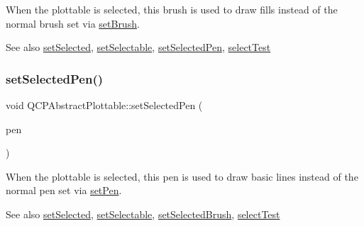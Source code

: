 When the plottable is selected, this brush is used to draw fills instead of the normal brush set via \hyperlink{class_q_c_p_abstract_plottable_a7a4b92144dca6453a1f0f210e27edc74}{set\+Brush}.

\begin{DoxySeeAlso}{See also}
\hyperlink{class_q_c_p_abstract_plottable_afbd5428c2952f59d952e11ab5cd79176}{set\+Selected}, \hyperlink{class_q_c_p_abstract_plottable_a22c69299eb5569e0f6bf084877a37dc4}{set\+Selectable}, \hyperlink{class_q_c_p_abstract_plottable_a6911603cad23ab0469b108224517516f}{set\+Selected\+Pen}, \hyperlink{class_q_c_p_abstract_plottable_a38efe9641d972992a3d44204bc80ec1d}{select\+Test} 
\end{DoxySeeAlso}
\hypertarget{class_q_c_p_abstract_plottable_a6911603cad23ab0469b108224517516f}{}\label{class_q_c_p_abstract_plottable_a6911603cad23ab0469b108224517516f} 
\subsubsection{\texorpdfstring{set\+Selected\+Pen()}{setSelectedPen()}}
{\footnotesize\ttfamily void Q\+C\+P\+Abstract\+Plottable\+::set\+Selected\+Pen (\begin{DoxyParamCaption}\item[{const Q\+Pen \&}]{pen }\end{DoxyParamCaption})}

When the plottable is selected, this pen is used to draw basic lines instead of the normal pen set via \hyperlink{class_q_c_p_abstract_plottable_ab74b09ae4c0e7e13142fe4b5bf46cac7}{set\+Pen}.

\begin{DoxySeeAlso}{See also}
\hyperlink{class_q_c_p_abstract_plottable_afbd5428c2952f59d952e11ab5cd79176}{set\+Selected}, \hyperlink{class_q_c_p_abstract_plottable_a22c69299eb5569e0f6bf084877a37dc4}{set\+Selectable}, \hyperlink{class_q_c_p_abstract_plottable_ae8c816874089f7a44001e8618e81a9dc}{set\+Selected\+Brush}, \hyperlink{class_q_c_p_abstract_plottable_a38efe9641d972992a3d44204bc80ec1d}{select\+Test} 
\end{DoxySeeAlso}
\hypertarget{class_q_c_p_abstract_plottable_a71626a07367e241ec62ad2c34baf21cb}{}\label{class_q_c_p_abstract_plottable_a71626a07367e241ec62ad2c34baf21cb} 
